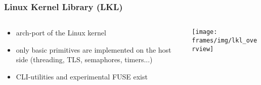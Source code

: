 

\begin{frame}
    \frametitle{Linux Kernel Library (LKL)}
        \begin{columns}[c]
            \begin{column}{.45\textwidth}
                \begin{itemize}
                    \item arch-port of the Linux kernel
                    \item only basic primitives are implemented on the host side (threading, TLS, semaphores, timers...)
                    \item CLI-utilities and experimental FUSE exist
                \end{itemize}
            \end{column}
            \begin{column}{.55\textwidth}
\texttt{[image: frames/img/lkl\_overview]}
            \end{column}
        \end{columns}


\end{frame}